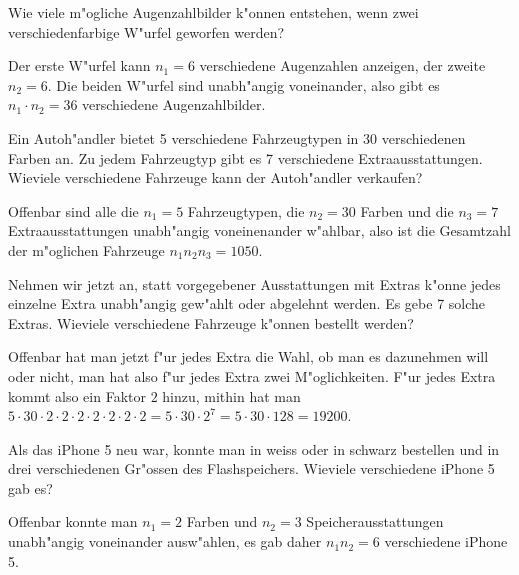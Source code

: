 \begin{beispiele}
\item Wie viele m"ogliche Augenzahlbilder k"onnen entstehen, wenn zwei
verschiedenfarbige W"urfel geworfen werden?

\begin{loesung}
Der erste W"urfel kann $n_1=6$ verschiedene Augenzahlen anzeigen,
der zweite $n_2=6$.
Die beiden W"urfel sind unabh"angig voneinander,
also gibt es $n_1\cdot n_2=36$ verschiedene Augenzahlbilder.
\end{loesung}


\item Ein Autoh"andler bietet 5 verschiedene Fahrzeugtypen in 30
verschiedenen Farben an.
Zu jedem Fahrzeugtyp gibt es 7 verschiedene Extraausstattungen.
Wieviele verschiedene Fahrzeuge kann der Autoh"andler verkaufen?

\begin{loesung}
Offenbar sind alle die $n_1=5$ Fahrzeugtypen, die $n_2=30$ Farben
und die $n_3=7$ Extraausstattungen unabh"angig voneinenander w"ahlbar, also ist
die Gesamtzahl der m"oglichen Fahrzeuge $n_1n_2n_3=1050$.
\end{loesung}

\item Nehmen wir jetzt an, statt vorgegebener Ausstattungen mit
Extras k"onne jedes einzelne Extra unabh"angig gew"ahlt oder
abgelehnt werden.
Es gebe 7 solche Extras.
Wieviele verschiedene Fahrzeuge k"onnen bestellt werden?

\begin{loesung}
Offenbar hat man jetzt f"ur jedes Extra die Wahl, ob man es dazunehmen
will oder nicht, man hat also f"ur jedes Extra zwei M"oglichkeiten.
F"ur jedes Extra kommt also ein Faktor $2$ hinzu, mithin hat man
$5\cdot 30
\cdot 2
\cdot 2
\cdot 2
\cdot 2
\cdot 2
\cdot 2
\cdot 2
=5\cdot 30\cdot 2^7=5\cdot 30 \cdot 128=19200$.
\end{loesung}

\item Als das iPhone 5 neu war, konnte man in weiss oder in schwarz
bestellen und in drei verschiedenen
Gr"ossen des Flashspeichers.
Wieviele verschiedene iPhone 5 gab es?

\begin{loesung}
Offenbar konnte man $n_1=2$ Farben und $n_2=3$ Speicherausstattungen
unabh"angig voneinander ausw"ah\-len, es gab
daher $n_1n_2=6$ verschiedene iPhone 5.
\end{loesung}

\end{beispiele}

